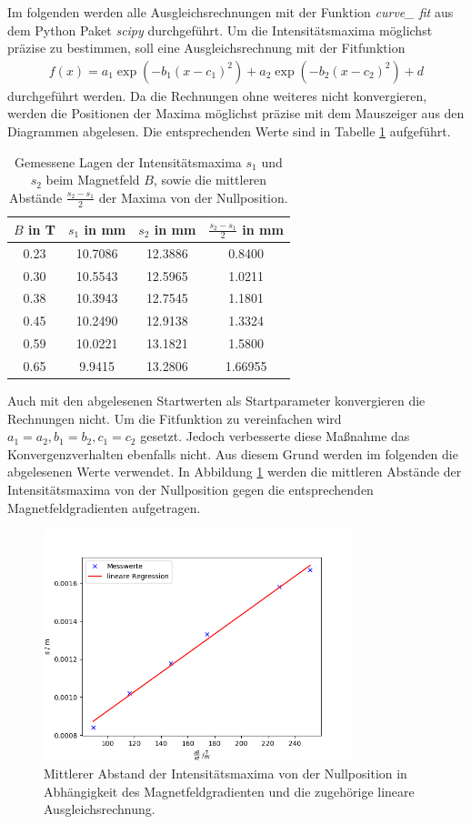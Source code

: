 Im folgenden werden alle Ausgleichsrechnungen mit der Funktion \textit{curve\_ fit} aus dem Python Paket \textit{scipy} durchgeführt.
Um die Intensitätsmaxima möglichst präzise zu bestimmen, soll eine Ausgleichsrechnung mit der Fitfunktion
\begin{align*}
f(x)=a_1\exp(-b_1(x-c_1)^2) + a_2\exp(-b_2(x-c_2)^2) + d
\end{align*}
durchgeführt werden.
Da die Rechnungen ohne weiteres nicht konvergieren, werden die Positionen der Maxima möglichst präzise mit dem Mauszeiger aus den Diagrammen abgelesen.
Die entsprechenden Werte sind in Tabelle \ref{tab:a:1} aufgeführt.
\begin{table}
\centering
\caption{Gemessene Lagen der Intensitätsmaxima $s_1$ und $s_2$ beim Magnetfeld $B$, sowie die mittleren Abstände $\frac{s_2 - s_1}{2}$ der Maxima von der Nullposition.}
\label{tab:a:1}
\begin{tabular}{c c c c}
\hline
$B$ in T & $s_1$ in mm & $s_2$ in mm & $\frac{s_2 - s_1}{2}$ in mm\\ \hline
0.23 &10.7086  &12.3886  &0.8400  \\
0.30 &10.5543  &12.5965  &1.0211   \\
0.38 &10.3943  &12.7545  &1.1801   \\
0.45 &10.2490 &12.9138  &1.3324   \\
0.59 &10.0221  &13.1821  &1.5800  \\
0.65 &9.9415  &13.2806  &1.66955 \\
\hline
\end{tabular}
\end{table}
Auch mit den abgelesenen Startwerten als Startparameter konvergieren die Rechnungen nicht.
Um die Fitfunktion zu vereinfachen wird $a_1=a_2, b_1=b_2,c_1=c_2$ gesetzt.
Jedoch verbesserte diese Maßnahme das Konvergenzverhalten ebenfalls nicht.
Aus diesem Grund werden im folgenden die abgelesenen Werte verwendet.
In Abbildung \ref{fig:a:8} werden die mittleren Abstände der Intensitätsmaxima von der Nullposition gegen die entsprechenden Magnetfeldgradienten aufgetragen.
\begin{figure}
\centering
\includegraphics[width=0.8\textwidth]{python/plots/plot_8.png}
\caption{Mittlerer Abstand der Intensitätsmaxima von der Nullposition in Abhängigkeit des Magnetfeldgradienten und die zugehörige lineare Ausgleichsrechnung.}
\label{fig:a:8}
\end{figure}
